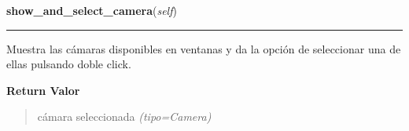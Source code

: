 \hspace{.8\funcindent}\begin{boxedminipage}{\funcwidth}

    \raggedright \textbf{show\_and\_select\_camera}(\textit{self})

    \vspace{-1.5ex}

    \rule{\textwidth}{0.5\fboxrule}
\setlength{\parskip}{2ex}
Muestra las cámaras disponibles en ventanas y da la opción de seleccionar una de ellas pulsando doble click.

\setlength{\parskip}{1ex}
      \textbf{Return Valor}
    \vspace{-1ex}

      \begin{quote}

cámara seleccionada
      {\it (tipo=Camera)}

      \end{quote}

    \end{boxedminipage}

